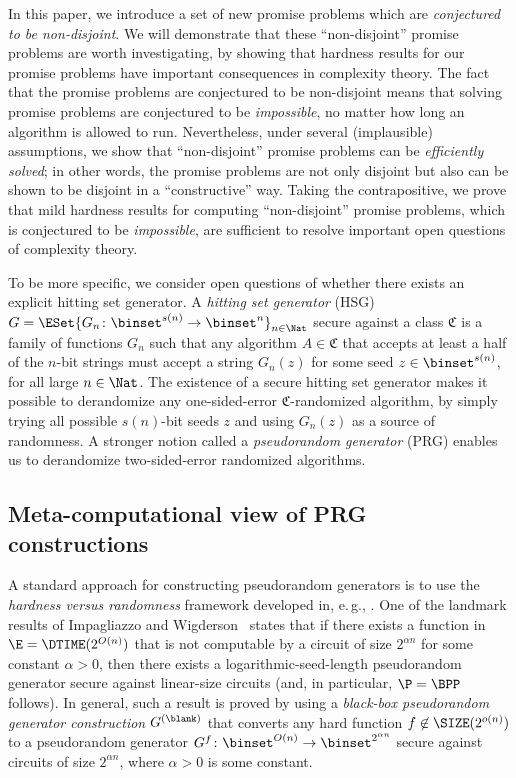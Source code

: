 \documentclass[11pt]{article}
\numberwithin{equation}{section}
\theoremstyle{definition}
\theoremstyle{plain}
\newcommand{\eg}{e.\,g.}
\begin{document}
In this paper, we introduce a set of new promise problems which are \emph{conjectured to be non-disjoint}.
We will demonstrate that these ``non-disjoint'' promise problems are worth investigating,
by showing
that hardness results for our promise problems have important consequences in complexity theory.
The fact that the promise problems are conjectured to be non-disjoint
means
that
solving promise problems are conjectured to be \emph{impossible},
no matter how long an algorithm is allowed to run.
Nevertheless,
under several (implausible) assumptions,
we show that ``non-disjoint'' promise problems can be \emph{efficiently solved};
in other words, the promise problems are not only disjoint but also can be shown to be disjoint in a ``constructive'' way.
%
%
Taking the contrapositive,
we prove that
mild hardness results for computing ``non-disjoint'' promise problems, which is conjectured to be \emph{impossible},
are sufficient to resolve important open questions of complexity theory.


To be more specific,
we consider open questions of whether there exists an explicit hitting set generator.
A \emph{hitting set generator} (HSG) $G = \ESet{G_n \colon \binset^{s(n)} \to \binset^n}_{n \in \Nat}$
secure against a class $\mathfrak{C}$
is a family of functions $G_n$
such that
any algorithm $A \in \mathfrak{C}$
that accepts at least a half of the $n$-bit strings
must accept a string $G_n(z)$ for some seed $z \in \binset^{s(n)}$,
for all large $n \in \Nat$.
The existence of a secure hitting set generator
makes it possible to
derandomize any one-sided-error $\mathfrak{C}$-randomized algorithm,
by simply trying all possible $s(n)$-bit seeds $z$
and using $G_n(z)$ as a source of randomness.
A stronger notion called a \emph{pseudorandom generator} (PRG) enables us to derandomize two-sided-error randomized algorithms.


\subsection{Meta-computational view of PRG constructions}
A standard approach for constructing pseudorandom generators
is to use the \emph{hardness versus randomness} framework
developed in, \eg, \cite{Yao82a_focs_conf, BlumM84_siamcomp_journals, NisanW94_jcss_journals, BabaiFNW93_cc_journals, Impagliazzo95_focs_conf, ImpagliazzoW97_stoc_conf, SudanTV01_jcss_journals, KlivansM02_siamcomp_journals}.
One of the landmark results of Impagliazzo and Wigderson~\cite{ImpagliazzoW97_stoc_conf}
states that if there exists a function in $\E = \DTIME(2^{O(n)})$
that is not computable by a circuit of size $2^{\alpha n}$ for some constant $\alpha > 0$,
then there exists a logarithmic-seed-length pseudorandom generator secure against linear-size circuits (and, in particular, $\P = \BPP$ follows).
%
In general,
such a result is proved by using a \emph{black-box pseudorandom generator construction} $G^{(\blank)}$
that converts any hard function $f \not\in \SIZE(2^{o(n)})$ to a pseudorandom generator $G^f \colon \binset^{O(n)} \to \binset^{2^{\alpha n}}$
secure against circuits of size $2^{\alpha n}$,
where $\alpha > 0$ is some constant.
%
%
%
%
%
%
%
%
%
%
%
%
%
%
%
%
%
%
%
%
%
%
%
%
%
%
%
%
%
\end{document}
